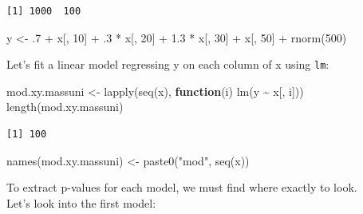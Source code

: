 \documentclass[
]{book}
\newenvironment{Shaded}{\begin{snugshade}}{\end{snugshade}}
\newcommand{\ControlFlowTok}[1]{\textcolor[rgb]{0.13,0.29,0.53}{\textbf{#1}}}
\newcommand{\DecValTok}[1]{\textcolor[rgb]{0.00,0.00,0.81}{#1}}
\newcommand{\FloatTok}[1]{\textcolor[rgb]{0.00,0.00,0.81}{#1}}
\newcommand{\FunctionTok}[1]{\textcolor[rgb]{0.00,0.00,0.00}{#1}}
\newcommand{\NormalTok}[1]{#1}
\newcommand{\OtherTok}[1]{\textcolor[rgb]{0.56,0.35,0.01}{#1}}
\newcommand{\SpecialCharTok}[1]{\textcolor[rgb]{0.00,0.00,0.00}{#1}}
\newcommand{\StringTok}[1]{\textcolor[rgb]{0.31,0.60,0.02}{#1}}
\begin{document}
\begin{verbatim}
[1] 1000  100
\end{verbatim}

\begin{Shaded}
\begin{Highlighting}[]
\NormalTok{y }\OtherTok{\textless{}{-}}\NormalTok{ .}\DecValTok{7} \SpecialCharTok{+}\NormalTok{ x[, }\DecValTok{10}\NormalTok{] }\SpecialCharTok{+}\NormalTok{ .}\DecValTok{3} \SpecialCharTok{*}\NormalTok{ x[, }\DecValTok{20}\NormalTok{] }\SpecialCharTok{+} \FloatTok{1.3} \SpecialCharTok{*}\NormalTok{ x[, }\DecValTok{30}\NormalTok{] }\SpecialCharTok{+}\NormalTok{ x[, }\DecValTok{50}\NormalTok{] }\SpecialCharTok{+} \FunctionTok{rnorm}\NormalTok{(}\DecValTok{500}\NormalTok{)}
\end{Highlighting}
\end{Shaded}

Let's fit a linear model regressing y on each column of x using \texttt{lm}:

\begin{Shaded}
\begin{Highlighting}[]
\NormalTok{mod.xy.massuni }\OtherTok{\textless{}{-}} \FunctionTok{lapply}\NormalTok{(}\FunctionTok{seq}\NormalTok{(x), }\ControlFlowTok{function}\NormalTok{(i) }\FunctionTok{lm}\NormalTok{(y }\SpecialCharTok{\textasciitilde{}}\NormalTok{ x[, i]))}
\FunctionTok{length}\NormalTok{(mod.xy.massuni)}
\end{Highlighting}
\end{Shaded}

\begin{verbatim}
[1] 100
\end{verbatim}

\begin{Shaded}
\begin{Highlighting}[]
\FunctionTok{names}\NormalTok{(mod.xy.massuni) }\OtherTok{\textless{}{-}} \FunctionTok{paste0}\NormalTok{(}\StringTok{"mod"}\NormalTok{, }\FunctionTok{seq}\NormalTok{(x))}
\end{Highlighting}
\end{Shaded}

To extract p-values for each model, we must find where exactly to look.\\
Let's look into the first model:

\begin{Shaded}
\end{Shaded}
\end{document}
